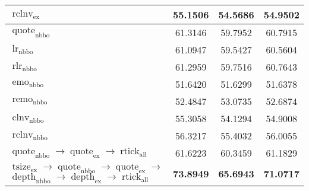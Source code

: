 \begin{table}
\begin{tabular}{lSSS}
        $\operatorname{rclnv}_{\mathrm{ex}}$                                                                                  & 55.1506              & 54.5686           & 54.9502 \\\midrule
        $\operatorname{quote}_{\mathrm{nbbo}}$                                                                                & 61.3146              & 59.7952           & 60.7915 \\
        $\operatorname{lr}_{\mathrm{nbbo}}$                                                                                   & 61.0947              & 59.5427           & 60.5604 \\
        $\operatorname{rlr}_{\mathrm{nbbo}}$                                                                                  & 61.2959              & 59.7516           & 60.7643 \\
        $\operatorname{emo}_{\mathrm{nbbo}}$                                                                                  & 51.6420              & 51.6299           & 51.6378 \\
        $\operatorname{remo}_{\mathrm{nbbo}}$                                                                                 & 52.4847              & 53.0735           & 52.6874 \\
        $\operatorname{clnv}_{\mathrm{nbbo}}$                                                                                 & 55.3058              & 54.1294           & 54.9008 \\
        $\operatorname{rclnv}_{\mathrm{nbbo}}$                                                                                & 56.3217              & 55.4032           & 56.0055 \\\midrule
        $\operatorname{quote}_{\mathrm{nbbo}} \to \operatorname{quote}_{\mathrm{ex}} \to \operatorname{rtick}_{\mathrm{all}}$ & 61.6223              & 60.3459           & 61.1829 \\
         & \bfseries 73.8949 & \bfseries 65.6943 & \bfseries 71.0717 \\\bottomrule
    \end{tabular}
\end{table}

